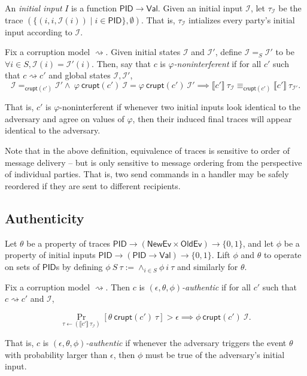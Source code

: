\documentclass{article}
\newcommand{\Val}{\mathsf{Val}}
\newcommand{\PID}{\mathsf{PID}}
\newcommand{\NewEv}{\mathsf{NewEv}}
\newcommand{\OldEv}{\mathsf{OldEv}}
\newcommand{\I}{\mathcal{I}}
\begin{document}
An \emph{initial input} $I$ is a function $\PID \to \Val$. Given an initial input $\I$, let $\tau_\I$ be the trace $(\{(i,i,\I(i)) \mid i \in \textsf{PID}\}, \emptyset)$. That is, $\tau_\I$ intializes every party's initial input according to $\I$.

Fix a corruption model $\rightsquigarrow$. Given initial states $\I$ and $\I'$, define $\I =_S \I'$ to be $\forall i \in S, \I(i) = \I'(i).$ Then, say that $c$ is \emph{$\varphi$-noninterferent} if for all $c'$ such that $c \rightsquigarrow c'$ and global states $\I, \I'$, 
\[ \I=_{\mathsf{crupt}(c')}\I' \wedge\ \varphi\ \mathsf{crupt}(c')\ \I = \varphi\ \mathsf{crupt}(c')\ \I' \implies \llbracket c' \rrbracket\ \tau_\I \equiv_{\mathsf{crupt}(c')} \llbracket c' \rrbracket\ \tau_{\I'}.\]

That is, $c'$ is $\varphi$-noninterferent  if whenever two initial inputs look identical to the adversary and agree on values of $\varphi$, then their induced final traces will appear identical to the adversary. 

Note that in the above definition, equivalence of traces is sensitive to order of message delivery -- but is only sensitive to message ordering from the perspective of individual parties. That is, two send commands in a handler may be safely reordered if they are sent to different recipients.


\subsection{Authenticity}

Let $\theta$ be a property of traces $\PID \to (\NewEv \times \OldEv) \to \{0,1\}$, and let $\phi$ be a property of initial inputs $\PID \to (\PID \to \Val) \to \{0,1\}$. Lift $\phi$ and $\theta$ to operate on sets of $\PID$s by defining $\phi\ S\ \tau := \wedge_{i \in S} \phi\ i\ \tau$ and similarly for $\theta$.

Fix a corruption model $\rightsquigarrow$. Then $c$ is \emph{$(\epsilon, \theta, \phi)$-authentic} if for all $c'$ such that $c \rightsquigarrow c'$ and $\I$,

\[ \Pr_{\tau \leftarrow (\llbracket c' \rrbracket\ \tau_\I)}[\theta\ \mathsf{crupt}(c')\ \tau] > \epsilon \implies \phi\ \mathsf{crupt}(c')\ \I.\]

That is, $c$ is \emph{$(\epsilon, \theta, \phi)$-authentic} if whenever the adversary triggers the event $\theta$ with probability larger than $\epsilon$, then $\phi$ must be true of the adversary's initial input.
\end{document}
